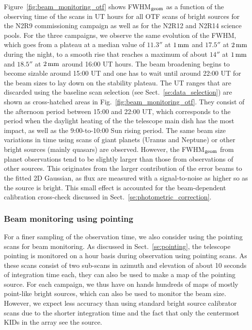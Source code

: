 Figure~\ref{fig:beam_monitoring_otf} shows FWHM$_{\rm{geom}}$ as a
function of the observing time of the scans in UT hours for all OTF
scans of bright sources for the N2R9 commissioning campaign as well
as for the N2R12 and N2R14 science pools. For the three campaigns, we
observe the same evolution of the FWHM, which goes from a plateau at a
median value of $11.3''$ at $1\,\rm{mm}$ and $17.5''$ at $2\,\rm{mm}$
during the night, to a smooth rise that reaches a maximum of about $14''$
at $1\,\rm{mm}$ and $18.5''$ at $2\,\rm{mm}$ around 16:00 UT
hours. The beam broadening begins to become sizable around 15:00 UT
and one has to wait until around 22:00 UT for the beam sizes to lay
down on the stability plateau. The UT ranges that are discarded
using the baseline scan selection (see
Sect.~\ref{se:data_selection}) are shown as cross-hatched areas in
Fig.~\ref{fig:beam_monitoring_otf}. They consist of the afternoon
period between 15:00 and 22:00 UT, which corresponds to the period
when the daylight heating of the the telescope main dish has the most
impact, as well as the 9:00-to-10:00 Sun rising period.
The same beam size variations in time using scans of giant planets (Uranus and
Neptune) or other bright
sources (mainly quasars) are observed. However, the FWHM$_{\rm{geom}}$ from planet
observations tend to be slightly larger than those from observations
of other sources. This originates from the larger contribution of the
error beams to the fitted 2D Gaussian, as flux are measured with 
a signal-to-noise as higher so as the source is bright. This small
effect is accounted for the beam-dependent calibration cross-check
discussed in Sect.~\ref{se:photometric_correction}.


\subsubsection{Beam monitoring using pointing}
\label{se:beam_monitoring_pointing}

For a finer sampling of the observation time, we also consider using
the pointing scans for beam monitoring. As discussed in
Sect.~\ref{se:pointing}, the telescope pointing is
monitored on a hour basis during observation using pointing
scans. As these scans consist of two sub-scans in azimuth and
elevation of about 10 seconds of integration time each, they
can also be used to make a map of the pointing source. For each campaign,
we thus have on hands hundreds of maps of mostly point-like bright
sources, which can also be used to monitor the beam size. However, we
expect less accuracy than using standard bright source calibrator scans due to the
shorter integration time and the fact that only the centermost KIDs in
the array see the source.  

